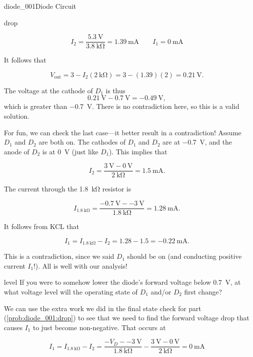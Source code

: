 \begin{mainquestion}{diode_001}{Diode Circuit}
\begin{partquestion}{drop}
\begin{answer}
\[
I_2
=
\frac{\qty{5.3}{\volt}}{\qty{3.8}{\kilo\ohm}}
=
\qty{1.39}{\milli\ampere}
\qquad
I_1 = \qty{0}{\milli\ampere}
\]

It follows that

\[
V_{\mathrm{out}}
=
3
-
I_2\left(\qty{2}{\kilo\ohm}\right)
=
3
-
(1.39)\left(2\right)
=
\qty{0.21}{\volt}.
\]

The voltage at the cathode of $D_1$ is thus
\[
\qty{0.21}{\volt}-\qty{0.7}{\volt}=\qty{-0.49}{\volt},
\]
which is greater than \qty{-0.7}{\volt}. There is no contradiction here, so this is a valid solution.

For fun, we can check the last case—it better result in a contradiction! Assume $D_1$ and $D_2$ are both on. The cathodes of $D_1$ and $D_2$ are at \qty{-0.7}{\volt}, and the anode of $D_2$ is at \qty{0}{\volt} (just like $D_1$). This implies that

\[
I_2
=
\frac{\qty{3}{\volt}-\qty{0}{\volt}}
{\qty{2}{\kilo\ohm}}
=
\qty{1.5}{\milli\ampere}.
\]

The current through the \qty{1.8}{\kilo\ohm} resistor is

\[
I_{\qty{1.8}{\kilo\ohm}}
=
\frac{\qty{-0.7}{\volt}-\qty{-3}{\volt}}
{\qty{1.8}{\kilo\ohm}}
=
\qty{1.28}{\milli\ampere}.
\]

It follows from KCL that

\[
I_1
=
I_{\qty{1.8}{\kilo\ohm}}-I_2
=
1.28-1.5
=
\qty{-0.22}{\milli\ampere}.
\]

This is a contradiction, since we said $D_1$ should be on (and conducting positive current $I_1$!). All is well with our analysis!
\end{answer}
\end{partquestion}

\begin{partquestion}{level}
{If you were to somehow lower the diode’s forward voltage below \qty{0.7}{\volt}, at what voltage level will the operating state of $D_1$ and/or $D_2$ first change?}

\begin{answer}
We can use the extra work we did in the final state check for part (\cref{prob:diode_001:drop}) to see that we need to find the forward voltage drop that causes $I_1$ to just become non-negative. That occurs at

\[
I_1
=
I_{\qty{1.8}{\kilo\ohm}}
-
I_2
=
\frac{-V_D-\qty{-3}{\volt}}{\qty{1.8}{\kilo\ohm}}
-
\frac{\qty{3}{\volt}-\qty{0}{\volt}}{\qty{2}{\kilo\ohm}}
=
\qty{0}{\milli\ampere}
\]


\end{answer}
\end{partquestion}
\end{mainquestion}
